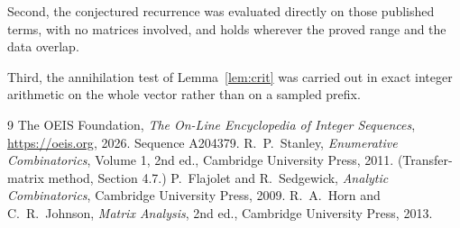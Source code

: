 \documentclass[11pt,a4paper]{article}
\theoremstyle{plain}
\theoremstyle{definition}
\begin{document}
Second, the conjectured recurrence was evaluated directly on those published terms, with no
matrices involved, and holds wherever the proved range and the data overlap.

Third, the annihilation test of Lemma~\ref{lem:crit} was carried out in exact integer
arithmetic on the whole vector rather than on a sampled prefix.

\begin{thebibliography}{9}
 The OEIS Foundation, \emph{The On-Line Encyclopedia of Integer
Sequences}, \url{https://oeis.org}, 2026. Sequence A204379.
 R.~P.~Stanley, \emph{Enumerative Combinatorics}, Volume 1, 2nd ed.,
Cambridge University Press, 2011. (Transfer-matrix method, Section 4.7.)
 P.~Flajolet and R.~Sedgewick, \emph{Analytic Combinatorics}, Cambridge
University Press, 2009.
 R.~A.~Horn and C.~R.~Johnson, \emph{Matrix Analysis}, 2nd ed., Cambridge
University Press, 2013.
\end{thebibliography}
\end{document}
